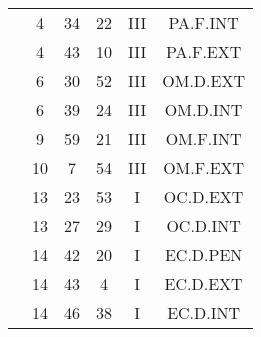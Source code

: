 \documentclass[12pt, a4paper]{article}
\begin{document}
\begin{multicols}{3}
{\begin{tabular}{c c c c c c}
	 	 	 	 & 4 & 34 & 22 & III & PA.F.INT\\%
	 	 	 	 & 4 & 43 & 10 & III & PA.F.EXT\\%
	 	 	 	 & 6 & 30 & 52 & III & OM.D.EXT\\%
	 	 	 	 & 6 & 39 & 24 & III & OM.D.INT\\%
	 	 	 	 & 9 & 59 & 21 & III & OM.F.INT\\%
	 	 	 	 & 10 & 7 & 54 & III & OM.F.EXT\\%
	 	 	 	 & 13 & 23 & 53 & I & OC.D.EXT\\%
	 	 	 	 & 13 & 27 & 29 & I & OC.D.INT\\%
	 	 	 	 & 14 & 42 & 20 & I & EC.D.PEN\\%
	 	 	 	 & 14 & 43 & 4 & I & EC.D.EXT\\%
	 	 	 	 & 14 & 46 & 38 & I & EC.D.INT\\%
	 	 \end{tabular}
 	}
\end{multicols}
\end{document}
